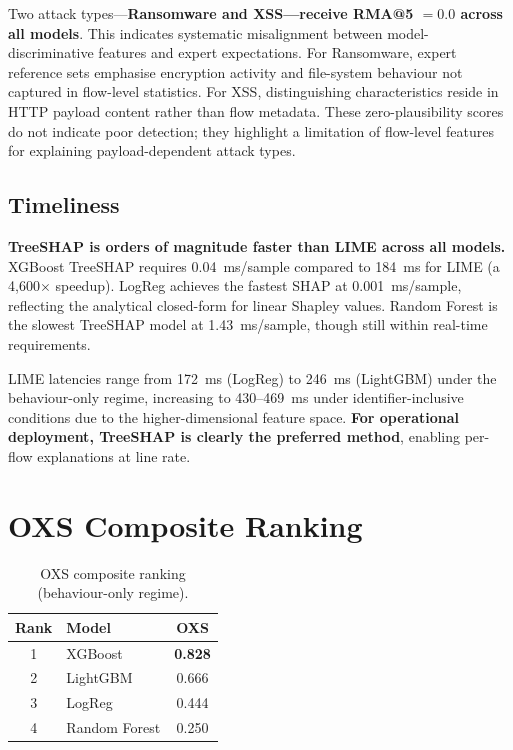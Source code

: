 \documentclass[12pt,a4paper]{report}
\begin{document}
Two attack types---\textbf{Ransomware and XSS---receive RMA@5 $= 0.0$ across all models}. This indicates systematic misalignment between model-discriminative features and expert expectations. For Ransomware, expert reference sets emphasise encryption activity and file-system behaviour not captured in flow-level statistics. For XSS, distinguishing characteristics reside in HTTP payload content rather than flow metadata. These zero-plausibility scores do not indicate poor detection; they highlight a limitation of flow-level features for explaining payload-dependent attack types.

\subsection{Timeliness}
\label{sec:time-results}

\textbf{TreeSHAP is orders of magnitude faster than LIME across all models.} XGBoost TreeSHAP requires 0.04~ms/sample compared to 184~ms for LIME (a 4,600$\times$ speedup). LogReg achieves the fastest SHAP at 0.001~ms/sample, reflecting the analytical closed-form for linear Shapley values. Random Forest is the slowest TreeSHAP model at 1.43~ms/sample, though still within real-time requirements.

LIME latencies range from 172~ms (LogReg) to 246~ms (LightGBM) under the behaviour-only regime, increasing to 430--469~ms under identifier-inclusive conditions due to the higher-dimensional feature space. \textbf{For operational deployment, TreeSHAP is clearly the preferred method}, enabling per-flow explanations at line rate.

\section{OXS Composite Ranking}
\label{sec:oxs-results}

\begin{table}[H]
\centering
\caption{OXS composite ranking (behaviour-only regime).}
\label{tab:oxs}
\begin{tabular}{clc}
\toprule
\textbf{Rank} & \textbf{Model} & \textbf{OXS} \\
\midrule
1 & XGBoost & \textbf{0.828} \\
2 & LightGBM & 0.666 \\
3 & LogReg & 0.444 \\
4 & Random Forest & 0.250 \\
\bottomrule
\end{tabular}
\end{table}
\end{document}
